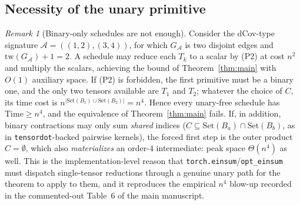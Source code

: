 \documentclass[11pt]{article}
\newcommand{\calA}{\mathcal{A}}
\newcommand{\tw}{\mathrm{tw}}
\newcommand{\treewidthp}[1]{\tw(#1)}
\newcommand{\takesetp}[1]{\mathrm{Set}(#1)}
\newcommand{\graphform}[1]{G_{#1}}
\newcommand{\Time}{\mathrm{Time}}
\newcommand{\opteinsum}{\texttt{opt\_einsum}}
\newcommand{\torcheinsum}{\texttt{torch.einsum}}
\theoremstyle{plain}
\theoremstyle{definition}
\theoremstyle{remark}
\newtheorem{remark}{Remark}
\begin{document}
\subsection{Necessity of the unary primitive}

\begin{remark}[Binary-only schedules are not enough]
\label{rem:dcov}
Consider the dCov-type signature $\calA = ((1,2),(3,4))$, for which
$\graphform{\calA}$ is two disjoint edges and
$\treewidthp{\graphform{\calA}}+1 = 2$.  A schedule may reduce each $T_k$ to a
scalar by (P2) at cost $n^2$ and multiply the scalars, achieving the bound
of Theorem~\ref{thm:main} with $O(1)$ auxiliary space.  If (P2) is
forbidden, the first primitive must be a binary one, and the only two
tensors available are $T_1$ and $T_2$; whatever the choice of $C$, its
time cost is $n^{|\takesetp{B_1}\cup\takesetp{B_2}|} = n^4$.  Hence every
unary-free schedule has $\Time \ge n^4$, and the equivalence of
Theorem~\ref{thm:main} fails.  If, in addition, binary contractions may
only sum \emph{shared} indices ($C \subseteq
\takesetp{B_a}\cap\takesetp{B_b}$, as in \texttt{tensordot}-backed pairwise
kernels), the forced first step is the outer product $C=\emptyset$, which
also \emph{materializes} an order-$4$ intermediate: peak space
$\Theta(n^4)$ as well.  This is the implementation-level reason that
\torcheinsum{}/\opteinsum{} must dispatch single-tensor reductions
through a genuine unary path for the theorem to apply to them, and it
reproduces the empirical $n^4$ blow-up recorded in the commented-out
Table~6 of the main manuscript.
\end{remark}
\end{document}
